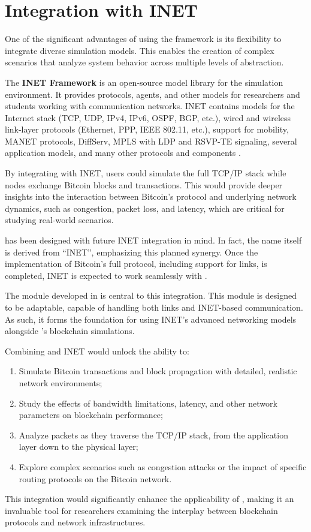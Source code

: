 \section{Integration with INET}\label{sec:INET}

One of the significant advantages of using the \omnetpp{} framework is its
flexibility to integrate diverse simulation models. This enables the creation
of complex scenarios that analyze system behavior across multiple levels of
abstraction.

The \textbf{INET Framework} is an open-source model library for the \omnetpp{}
simulation environment. It provides protocols, agents, and other models for
researchers and students working with communication networks. INET contains
models for the Internet stack (TCP, UDP, IPv4, IPv6, OSPF, BGP, etc.), wired
and wireless link-layer protocols (Ethernet, PPP, IEEE 802.11, etc.), support
for mobility, MANET protocols, DiffServ, MPLS with LDP and RSVP-TE signaling,
several application models, and many other protocols and components
\cite{inet}.

By integrating \iblock{} with INET, users could simulate the full TCP/IP stack
while nodes exchange Bitcoin blocks and transactions. This would provide deeper
insights into the interaction between Bitcoin's protocol and underlying network
dynamics, such as congestion, packet loss, and latency, which are critical for
studying real-world scenarios.

\iblock{} has been designed with future INET integration in mind. In fact, the
name \iblock{} itself is derived from ``INET'', emphasizing this planned
synergy. Once the implementation of Bitcoin's full protocol, including support
for \omnetpp{} links, is completed, INET is expected to work seamlessly with
\iblock{}.

The  module developed in  is
central to this integration. This module is designed to be adaptable, capable
of handling both \omnetpp{} links and INET-based communication. As such, it
forms the foundation for using INET's advanced networking models alongside
\iblock{}'s blockchain simulations.

Combining \iblock{} and INET would unlock the ability to:
\begin{enumerate}
	\item Simulate Bitcoin transactions and block propagation with
		detailed, realistic network environments;
	\item Study the effects of bandwidth limitations, latency, and other
		network parameters on blockchain performance;
	\item Analyze packets as they traverse the TCP/IP stack, from the
		application layer down to the physical layer;
	\item Explore complex scenarios such as congestion attacks or the
		impact of specific routing protocols on the Bitcoin network.
\end{enumerate}

This integration would significantly enhance the applicability of \iblock{},
making it an invaluable tool for researchers examining the interplay between
blockchain protocols and network infrastructures.
